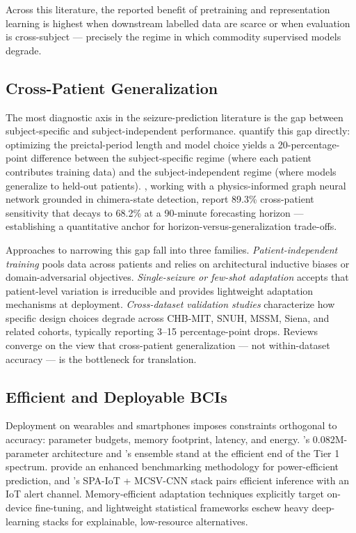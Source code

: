 Across this literature, the reported benefit of pretraining and representation learning is highest when downstream labelled data are scarce or when evaluation is cross-subject --- precisely the regime in which commodity supervised models degrade.

\subsection{Cross-Patient Generalization}
\label{sec:rw-xpatient}

The most diagnostic axis in the seizure-prediction literature is the gap between subject-specific and subject-independent performance. \citet{KoutsouvelisEtAl2024} quantify this gap directly: optimizing the preictal-period length and model choice yields a 20-percentage-point difference between the subject-specific regime (where each patient contributes training data) and the subject-independent regime (where models generalize to held-out patients). \citet{AmiriEtAl2026}, working with a physics-informed graph neural network grounded in chimera-state detection, report 89.3\% cross-patient sensitivity that decays to 68.2\% at a 90-minute forecasting horizon --- establishing a quantitative anchor for horizon-versus-generalization trade-offs.

Approaches to narrowing this gap fall into three families. \emph{Patient-independent training} \cite{DissanayakeEtAl2020,JangEtAl2026} pools data across patients and relies on architectural inductive biases or domain-adversarial objectives. \emph{Single-seizure or few-shot adaptation} \cite{TariqEtAl2020,JadduEtAl2024,MahdiBaghdadi2026} accepts that patient-level variation is irreducible and provides lightweight adaptation mechanisms at deployment. \emph{Cross-dataset validation studies} \cite{LiEtAl2025b,JangEtAl2026,MohammadSaeed2025,EsmaeilpourEtAl2024} characterize how specific design choices degrade across CHB-MIT, SNUH, MSSM, Siena, and related cohorts, typically reporting 3--15 percentage-point drops. Reviews \cite{WuEtAl2025,TanEtAl2025,RenEtAl2022} converge on the view that cross-patient generalization --- not within-dataset accuracy --- is the bottleneck for translation.

\subsection{Efficient and Deployable BCIs}
\label{sec:rw-efficient}

Deployment on wearables and smartphones imposes constraints orthogonal to accuracy: parameter budgets, memory footprint, latency, and energy. \citet{CaoEtAl2026}'s 0.082M-parameter architecture and \citet{AlkhrijahEtAl2025}'s ensemble stand at the efficient end of the Tier 1 spectrum. \citet{WangEtAl2021b} provide an enhanced benchmarking methodology for power-efficient prediction, and \citet{YedurkarEtAl2025}'s SPA-IoT + MCSV-CNN stack pairs efficient inference with an IoT alert channel. Memory-efficient adaptation techniques \cite{LiEtAl2025a,XuYu2026} explicitly target on-device fine-tuning, and lightweight statistical frameworks \cite{YangEtAl2025,WangEtAl2025b} eschew heavy deep-learning stacks for explainable, low-resource alternatives.

